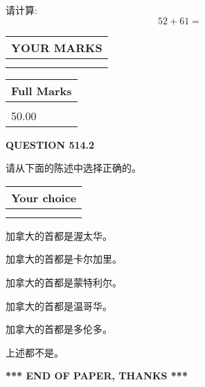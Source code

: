 \documentclass{ctexart}
\begin{document}
  
 
请计算:
\begin{equation}
52 +  %
61 = \nonumber
\end{equation}
 

 

 
  
\vspace{0.2in}
  
\noindent\begin{tabular}{|l|}
\hline
 YOUR MARKS  \\
\hline
 \\ 
 \\ 
\hline
\end{tabular}
\hspace{0.05in} \begin{tabular}{|l|}
\hline
 Full Marks  \\
\hline
 \\ 
50.00 \\
\hline
\end{tabular}
{\textbf{\Large{QUESTION
514.2 
}}}
  
  
请从下面的陈述中选择正确的。
  
  
\noindent\hspace{3.0in} \begin{tabular}{|l|}
\hline
Your choice \\
\hline
 \\ 
 \\ 
\hline
\end{tabular}
  
  
 
 
加拿大的首都是渥太华。
 
 
加拿大的首都是卡尔加里。
 
 
加拿大的首都是蒙特利尔。
 
 
加拿大的首都是温哥华。
 
 
加拿大的首都是多伦多。
 
 
 上述都不是。
 
 
   
   
 \vspace{0.2in}
 
   
   
   
   
\vspace{1.0in} 
{\textbf{\large{ *** END OF PAPER, THANKS *** }}} 
   
\end{document}
